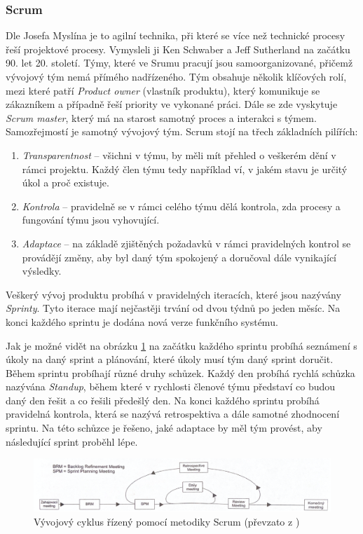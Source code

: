\documentclass[czech,master,public,dept460,male,cpdeclaration,oneside]{diploma}
\begin{document}
\subsubsection{Scrum}
Dle Josefa Myslína \cite{ref:scrum_myslin} je to agilní technika, při které se více než technické procesy řeší projektové procesy. Vymysleli ji Ken Schwaber a Jeff Sutherland na začátku 90. let 20. století. Týmy, které ve Srumu pracují jsou samoorganizované, přičemž vývojový tým nemá přímého nadřízeného. Tým obsahuje několik klíčových rolí, mezi které patří \textit{Product owner} (vlastník produktu), který komunikuje se zákazníkem a případně řeší priority ve vykonané práci. Dále se zde vyskytuje \textit{Scrum master}, který má na starost samotný proces a interakci s týmem. Samozřejmostí je samotný vývojový tým. Scrum stojí na třech základních pilířích: 

\begin{enumerate}
\item \textit{Transparentnost} -- všichni v týmu, by měli mít přehled o veškerém dění v rámci projektu. Každý člen týmu tedy například ví, v jakém stavu je určitý úkol a proč existuje.
\item \textit{Kontrola} -- pravidelně se v rámci celého týmu dělá kontrola, zda procesy a fungování týmu jsou vyhovující.
\item \textit{Adaptace} -- na základě zjištěných požadavků v rámci pravidelných kontrol se provádějí změny, aby byl daný tým spokojený a doručoval dále vynikající výsledky.
\end{enumerate}

Veškerý vývoj produktu probíhá v pravidelných iteracích, které jsou nazývány \textit{Sprinty}. Tyto iterace mají nejčastěji trvání od dvou týdnů po jeden měsíc. Na konci každého sprintu je dodána nová verze funkčního systému. 

Jak je možné vidět na obrázku \ref{fig:scrum_cyklus} na začátku každého sprintu probíhá seznámení s úkoly na daný sprint a plánování, které úkoly musí tým daný sprint doručit. Během sprintu probíhají různé druhy schůzek. Každý den probíhá rychlá schůzka nazývána \textit{Standup}, během které v rychlosti členové týmu představí co budou daný den řešit a co řešili předešlý den. Na konci každého sprintu probíhá pravidelná kontrola, která se nazývá retrospektiva a dále samotné zhodnocení sprintu. Na této schůzce je řešeno, jaké adaptace by měl tým provést, aby následující sprint proběhl lépe. 

\begin{figure}[!ht]
    \centering
    \includegraphics[width=1\textwidth]{Diplomka/Figures/scrum.png}
    \caption{Vývojový cyklus řízený pomocí metodiky Scrum (převzato z \cite{ref:scrum_myslin_cyklus_img})}
    \label{fig:scrum_cyklus}
\end{figure}
\end{document}
